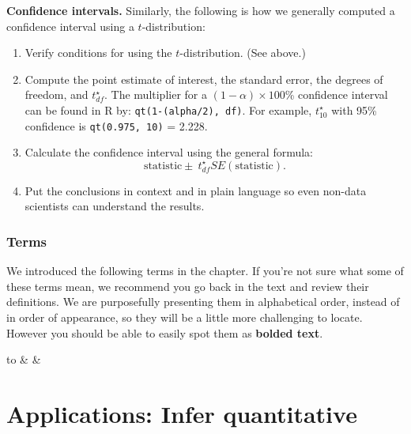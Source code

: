 \documentclass[
  10pt,
  openany]{book}
\providecommand{\tightlist}{%
  \setlength{\itemsep}{0pt}\setlength{\parskip}{0pt}}
\theoremstyle{definition}
\theoremstyle{definition}
\theoremstyle{definition}
\theoremstyle{definition}
\theoremstyle{remark}
\begin{document}
\textbf{Confidence intervals.} Similarly, the following is how we generally computed a confidence interval using a \(t\)-distribution:

\begin{enumerate}
\def\labelenumi{\arabic{enumi}.}
\tightlist
\item
  Verify conditions for using the \(t\)-distribution. (See above.)\\
\item
  Compute the point estimate of interest, the standard error, the degrees of freedom, and \(t^{\star}_{df}\). The multiplier for a \((1-\alpha)\times100\)\% confidence interval can be found in R by: \texttt{qt(1-(alpha/2),\ df)}. For example, \(t^{\star}_{10}\) with 95\% confidence is \texttt{qt(0.975,\ 10)} = 2.228.
\item
  Calculate the confidence interval using the general formula:
  \[
   \mbox{statistic} \pm\ t_{df}^{\star} SE(\mbox{statistic}).
   \]
\item
  Put the conclusions in context and in plain language so even non-data scientists can understand the results.
\end{enumerate}

\subsection*{Terms}\label{terms-15}

We introduced the following terms in the chapter. If you're not sure what some of these terms mean, we recommend you go back in the text and review their definitions. We are purposefully presenting them in alphabetical order, instead of in order of appearance, so they will be a little more challenging to locate. However you should be able to easily spot them as \textbf{bolded text}.

\begin{tabu} to 
\toprule
{} &  & \\
\bottomrule
\end{tabu}

\chapter{Applications: Infer quantitative}\label{inference-num-applications}
\end{document}
